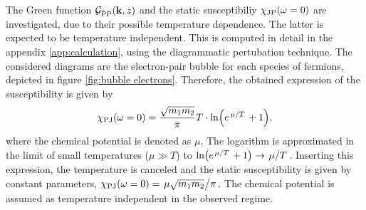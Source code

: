The Green function $\mathcal{G}_{\dot{\mathrm{P}}\dot{\mathrm{P}}}(\vb{k}, z)$ and the static susceptibiliy $\chi_{\mathrm{JP}}(\omega = 0)$ are investigated, due to their possible temperature dependence.
The latter is expected to be temperature independent.
This is computed in detail in the appendix \ref{app:calculation}, using the diagrammatic pertubation technique.
The considered diagrams are the electron-pair bubble for each species of fermions, depicted in figure \ref{fig:bubble electrons}.
Therefore, the obtained expression of the susceptibility is given by
%
\begin{align}
	\chi_{\mt{PJ}}(\omega = 0) = \frac{\sqrt{m_{1} m_{2}}}{\pi} T \cdot \ln(e^{\flatfrac{\mu}{T}} + 1),
	\label{eq:static susceptibility computed}
\end{align}
%
where the chemical potential is denoted as $\mu$.
The logarithm is approximated in the limit of small temperatures ($\mu \gg T$) to $\ln(e^{\flatfrac{\mu}{T}} + 1) \rightarrow \flatfrac{\mu}{T}$.
Inserting this expression, the temperature is canceled and the static susceptibility is given by constant parameters, $\chi_{\mt{PJ}}(\omega = 0) = \flatfrac{\mu\sqrt{m_{1} m_{2}}}{\pi}$.
The chemical potential is assumed as temperature independent in the observed regime.

